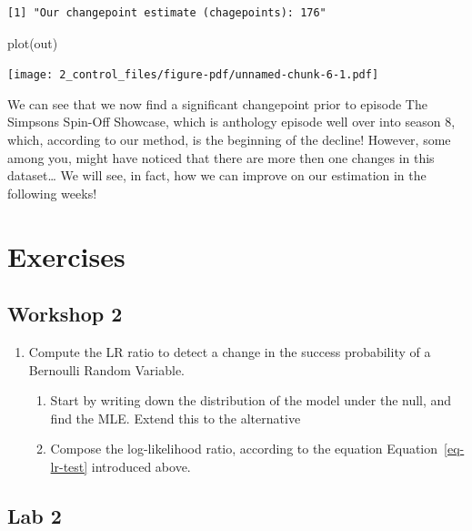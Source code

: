 \documentclass[
  letterpaper,
  DIV=11,
  numbers=noendperiod]{scrreprt}
\newenvironment{Shaded}{\begin{snugshade}}{\end{snugshade}}
\newcommand{\FunctionTok}[1]{\textcolor[rgb]{0.28,0.35,0.67}{#1}}
\newcommand{\NormalTok}[1]{\textcolor[rgb]{0.00,0.23,0.31}{#1}}
\begin{document}
\begin{verbatim}
[1] "Our changepoint estimate (chagepoints): 176"
\end{verbatim}

\begin{Shaded}
\begin{Highlighting}[]
\FunctionTok{plot}\NormalTok{(out)}
\end{Highlighting}
\end{Shaded}

\texttt{[image: 2\_control\_files/figure-pdf/unnamed-chunk-6-1.pdf]}

We can see that we now find a significant changepoint prior to episode
The Simpsons Spin-Off Showcase, which is anthology episode well over
into season 8, which, according to our method, is the beginning of the
decline! However, some among you, might have noticed that there are more
then one changes in this dataset\ldots{} We will see, in fact, how we
can improve on our estimation in the following weeks!

\section{Exercises}\label{exercises-1}

\subsection{Workshop 2}\label{workshop-2}

\begin{enumerate}
\def\labelenumi{\arabic{enumi}.}
\item
  Compute the LR ratio to detect a change in the success probability of
  a Bernoulli Random Variable.

  \begin{enumerate}
  \def\labelenumii{\alph{enumii}.}
  \item
    Start by writing down the distribution of the model under the null,
    and find the MLE. Extend this to the alternative
  \item
    Compose the log-likelihood ratio, according to the equation
    Equation~\ref{eq-lr-test} introduced above.
  \end{enumerate}
\end{enumerate}

\subsection{Lab 2}\label{lab-2}
\end{document}
